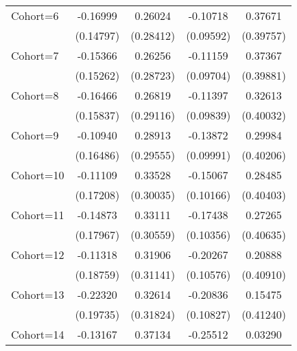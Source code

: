 \begin{table}[htbp]
\begin{tabular}{l*{4}{c}}
\addlinespace
Cohort=6            &    -0.16999         &     0.26024         &    -0.10718         &     0.37671         \\
                    &   (0.14797)         &   (0.28412)         &   (0.09592)         &   (0.39757)         \\
\addlinespace
Cohort=7            &    -0.15366         &     0.26256         &    -0.11159         &     0.37367         \\
                    &   (0.15262)         &   (0.28723)         &   (0.09704)         &   (0.39881)         \\
\addlinespace
Cohort=8            &    -0.16466         &     0.26819         &    -0.11397         &     0.32613         \\
                    &   (0.15837)         &   (0.29116)         &   (0.09839)         &   (0.40032)         \\
\addlinespace
Cohort=9            &    -0.10940         &     0.28913         &    -0.13872         &     0.29984         \\
                    &   (0.16486)         &   (0.29555)         &   (0.09991)         &   (0.40206)         \\
\addlinespace
Cohort=10           &    -0.11109         &     0.33528         &    -0.15067         &     0.28485         \\
                    &   (0.17208)         &   (0.30035)         &   (0.10166)         &   (0.40403)         \\
\addlinespace
Cohort=11           &    -0.14873         &     0.33111         &    -0.17438\sym{*}  &     0.27265         \\
                    &   (0.17967)         &   (0.30559)         &   (0.10356)         &   (0.40635)         \\
\addlinespace
Cohort=12           &    -0.11318         &     0.31906         &    -0.20267\sym{*}  &     0.20888         \\
                    &   (0.18759)         &   (0.31141)         &   (0.10576)         &   (0.40910)         \\
\addlinespace
Cohort=13           &    -0.22320         &     0.32614         &    -0.20836\sym{*}  &     0.15475         \\
                    &   (0.19735)         &   (0.31824)         &   (0.10827)         &   (0.41240)         \\
\addlinespace
Cohort=14           &    -0.13167         &     0.37134         &    -0.25512\sym{**} &     0.03290         \\

\end{tabular}
\end{table}
